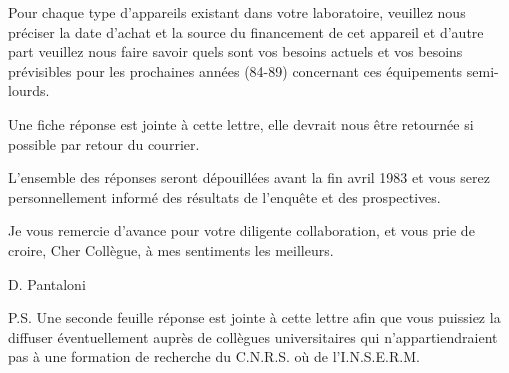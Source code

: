 Pour chaque type d'appareils existant dans votre laboratoire,
veuillez nous préciser la date d'achat et la source du financement de cet
appareil et d'autre part veuillez nous faire savoir quels sont vos
besoins actuels et vos besoins prévisibles pour les prochaines années
(84-89) concernant ces équipements semi-lourds.

Une fiche réponse est jointe à cette lettre, elle devrait nous être
retournée si possible par retour du courrier.

L'ensemble des réponses seront dépouillées avant la fin avril 1983
et vous serez personnellement informé des résultats de l'enquête et des
prospectives.

Je vous remercie d'avance pour votre diligente collaboration, et
vous prie de croire, Cher Collègue, à mes sentiments les meilleurs.

\begin{flushright}D. Pantaloni\end{flushright}


P.S. Une seconde feuille réponse est jointe à cette lettre afin que
vous puissiez la diffuser éventuellement auprès de collègues
universitaires qui n'appartiendraient pas à une formation de recherche
du C.N.R.S. où de l'I.N.S.E.R.M.
